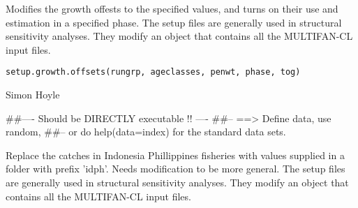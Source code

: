 \documentclass[a4paper]{book}
\begin{document}
%
\begin{Description}\relax

Modifies the growth offests to the specified values, and turns on their use and estimation in a specified phase. 
The setup files are generally used in structural sensitivity analyses. They modify an object that contains all the MULTIFAN-CL input files. 
\end{Description}
%
\begin{Usage}
\begin{verbatim}
setup.growth.offsets(rungrp, ageclasses, penwt, phase, tog)
\end{verbatim}
\end{Usage}
%
\begin{Arguments}
\begin{ldescription}
\item[\code{rungrp}] 


\item[\code{ageclasses}] 


\item[\code{penwt}] 


\item[\code{phase}] 


\item[\code{tog}] 


\end{ldescription}
\end{Arguments}
%
\begin{Author}\relax

Simon Hoyle
\end{Author}
%
\begin{Examples}
\begin{ExampleCode}
##---- Should be DIRECTLY executable !! ----
##-- ==>  Define data, use random,
##--	or do  help(data=index)  for the standard data sets.

\end{ExampleCode}
\end{Examples}
%
\begin{Description}\relax

Replace the catches in Indonesia Phillippines fisheries with values supplied in a folder with prefix 'idph'. Needs modification to be more general. 
The setup files are generally used in structural sensitivity analyses. They modify an object that contains all the MULTIFAN-CL input files. 
\end{Description}
\end{document}
